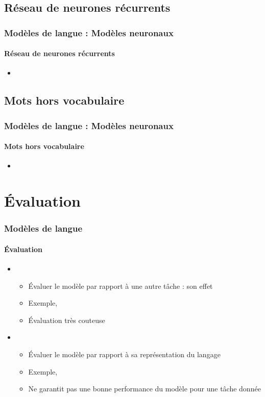 \documentclass[xcolor=table]{beamer}
\begin{document}
\subsection{Réseau de neurones récurrents}

\begin{frame}
\frametitle{Modèles de langue : Modèles neuronaux}
\framesubtitle{Réseau de neurones récurrents}

\begin{itemize}
	\item 
\end{itemize}

\end{frame}

\subsection{Mots hors vocabulaire}

\begin{frame}
\frametitle{Modèles de langue : Modèles neuronaux}
\framesubtitle{Mots hors vocabulaire}

\begin{itemize}
	\item 
\end{itemize}

\end{frame}

\section{Évaluation}

\begin{frame}
\frametitle{Modèles de langue}
\framesubtitle{Évaluation}

\begin{itemize}
	\item {}
	\begin{itemize}
		\item Évaluer le modèle par rapport à une autre tâche : son effet
		\item Exemple,  
		\item Évaluation très couteuse
	\end{itemize}
	\item {}
	\begin{itemize}
		\item Évaluer le modèle par rapport à sa représentation du langage
		\item Exemple,  
		\item Ne garantit pas une bonne performance du modèle pour une tâche donnée
	\end{itemize}
\end{itemize}

\end{frame}
\end{document}
